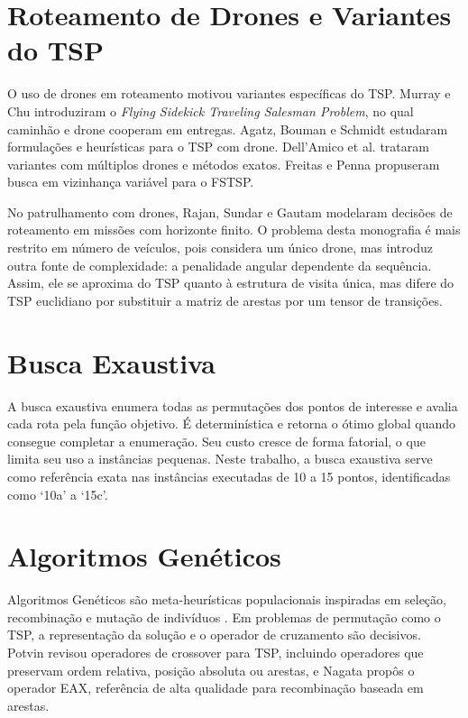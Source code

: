 \section{Roteamento de Drones e Variantes do \texorpdfstring{\ac{TSP}}{TSP}}
\label{sec:drone-tsp}

O uso de drones em roteamento motivou variantes específicas do \ac{TSP}. Murray e Chu \cite{murray2015flying} introduziram o \textit{Flying Sidekick Traveling Salesman Problem}, no qual caminhão e drone cooperam em entregas. Agatz, Bouman e Schmidt \cite{agatz2018optimization} estudaram formulações e heurísticas para o \ac{TSP} com drone. Dell'Amico et al. \cite{dellamico2021multiple,dellamico2022exact} trataram variantes com múltiplos drones e métodos exatos. Freitas e Penna \cite{freitas2020vns} propuseram busca em vizinhança variável para o FSTSP.

No patrulhamento com drones, Rajan, Sundar e Gautam \cite{rajan2022routing} modelaram decisões de roteamento em missões com horizonte finito. O problema desta monografia é mais restrito em número de veículos, pois considera um único drone, mas introduz outra fonte de complexidade: a penalidade angular dependente da sequência. Assim, ele se aproxima do \ac{TSP} quanto à estrutura de visita única, mas difere do \ac{TSP} euclidiano por substituir a matriz de arestas por um tensor de transições.

\section{Busca Exaustiva}
\label{sec:exaustiva}

A busca exaustiva enumera todas as permutações dos pontos de interesse e avalia cada rota pela função objetivo. É determinística e retorna o ótimo global quando consegue completar a enumeração. Seu custo cresce de forma fatorial, o que limita seu uso a instâncias pequenas. Neste trabalho, a busca exaustiva serve como referência exata nas \TotalInstanciasComOtimo{} instâncias executadas de 10 a 15 pontos, identificadas como `10a' a `15c'.

\section{Algoritmos Genéticos}
\label{sec:ga}

Algoritmos Genéticos são meta-heurísticas populacionais inspiradas em seleção, recombinação e mutação de indivíduos \cite{holland1975adaptation,goldberg1989genetic}. Em problemas de permutação como o \ac{TSP}, a representação da solução e o operador de cruzamento são decisivos. Potvin \cite{potvin1996ga} revisou operadores de crossover para \ac{TSP}, incluindo operadores que preservam ordem relativa, posição absoluta ou arestas, e Nagata \cite{nagata2013eax} propôs o operador EAX, referência de alta qualidade para recombinação baseada em arestas.

